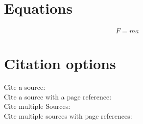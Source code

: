 
\cleardoublepage
\section{Equations}
\label{sec:equations}

\begin{align}
	F = m a 
	\label{eqn:newton_en}
\end{align}


\section{Citation options}

Cite a source: \cite{Sample.2012}\\
Cite a source with a page reference: \cite[12-16]{Sample.2012}\\
Cite multiple Sources: \cites{Samplem.2012}{Samplef.2011}\\
Cite multiple sources with page references: \cites[12-16]{Samplem.2012}[3]{Samplef.2011}\\

